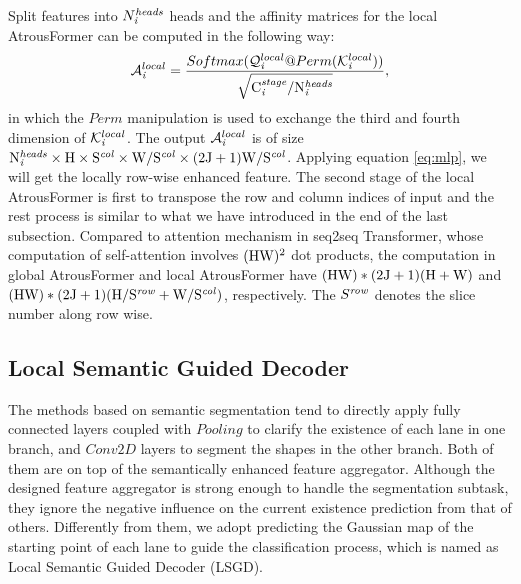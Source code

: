 \documentclass[preprint,12pt,review]{elsarticle}
\begin{document}
Split features into $N_{\it{i}}^{\it{heads}}$ heads and the 
affinity matrices for the local AtrousFormer can be computed in the following way:
\begin{equation}
	\mathcal{A}_{\it{i}}^{local} = \frac{Softmax(\mathcal{Q}_{\it{i}}^{local}@Perm(\mathcal{K}_{\it{i}}^{local}))}{\sqrt{\rm{\rm{C_{\it{i}}^{\it{stage}}}/N_{\it{i}}^{\it{heads}}}}},
\end{equation}
in which the $Perm$ manipulation is used to exchange the third and fourth dimension of $\mathcal{K}_{\it{i}}^{local}$. The output $\mathcal{A}_{\it{i}}^{local}$ is of size $\rm{N}_{\it{i}}^{\it{heads}} \times \rm{H}\times \rm{S}^{\it{col}} \times \rm{W/\rm{S}^{\it{col}}}\times (2\rm{J}+1)\rm{W/\rm{S}^{\it{col}}}$. Applying equation \eqref{eq:mlp}, we will get the locally row-wise enhanced feature. The second stage of the local AtrousFormer is first to transpose the row and column indices of input and the rest process is similar to what we have introduced in the end of the last subsection. Compared to attention mechanism in seq2seq Transformer, whose computation of self-attention involves $\rm (HW)^2$ dot products, the computation in global AtrousFormer and local AtrousFormer have $\rm (HW)*(2\rm{J}+1)(H+W)$ and $\rm (HW)*(2\rm{J}+1)(H/S^{\it{row}}+W/S^{\it{col}})$, respectively. The $S^{\it{row}}$  denotes the slice number along row wise.

\subsection{Local Semantic Guided Decoder}
The methods based on semantic segmentation tend to directly apply fully connected layers coupled with $Pooling$ to clarify the existence of each lane in one branch, and $Conv2D$ layers to segment the shapes in the other branch. Both of them are on top of the semantically enhanced feature aggregator. Although the designed feature aggregator is strong enough to handle the segmentation subtask, they ignore the negative influence on the current existence prediction from that of others. Differently from them, we adopt predicting the Gaussian map of the starting point of each lane to guide the classification process, which is named as Local Semantic Guided Decoder (LSGD).
\end{document}
